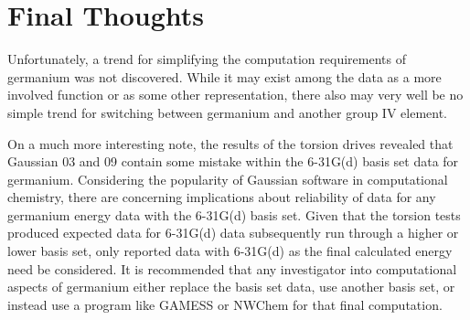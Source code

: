 \section{Final Thoughts}

Unfortunately, a trend for simplifying the computation requirements of germanium was not discovered.
While it may exist among the data as a more involved function or as some other representation, there also may very well be no simple trend for switching between germanium and another group IV element.

On a much more interesting note, the results of the torsion drives revealed that Gaussian 03 and 09 contain some mistake within the 6-31G(d) basis set data for germanium. 
Considering the popularity of Gaussian software in computational chemistry, there are concerning implications about reliability of data for any germanium energy data with the 6-31G(d) basis set. 
Given that the torsion tests produced expected data for 6-31G(d) data subsequently run through a higher or lower basis set, only reported data with 6-31G(d) as the final calculated energy need be considered.
It is recommended that any investigator into computational aspects of germanium either replace the basis set data, use another basis set, or instead use a program like GAMESS or NWChem for that final computation.



